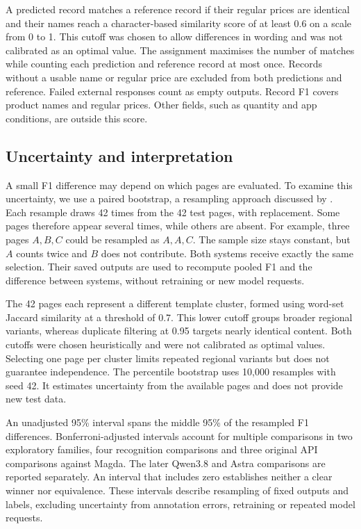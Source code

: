 A predicted record matches a reference record if their regular prices are identical and their names reach a character-based similarity score of at least 0.6 on a scale from 0 to 1. This cutoff was chosen to allow differences in wording and was not calibrated as an optimal value. The assignment maximises the number of matches while counting each prediction and reference record at most once. Records without a usable name or regular price are excluded from both predictions and reference. Failed external responses count as empty outputs. Record F1 covers product names and regular prices. Other fields, such as quantity and app conditions, are outside this score.

\subsection{Uncertainty and interpretation}
A small F1 difference may depend on which pages are evaluated. To examine this uncertainty, we use a paired bootstrap, a resampling approach discussed by \citet{dror2018}. Each resample draws 42 times from the 42 test pages, with replacement. Some pages therefore appear several times, while others are absent. For example, three pages $A,B,C$ could be resampled as $A,A,C$. The sample size stays constant, but $A$ counts twice and $B$ does not contribute. Both systems receive exactly the same selection. Their saved outputs are used to recompute pooled F1 and the difference between systems, without retraining or new model requests.

The 42 pages each represent a different template cluster, formed using word-set Jaccard similarity at a threshold of 0.7. This lower cutoff groups broader regional variants, whereas duplicate filtering at 0.95 targets nearly identical content. Both cutoffs were chosen heuristically and were not calibrated as optimal values. Selecting one page per cluster limits repeated regional variants but does not guarantee independence. The percentile bootstrap uses 10,000 resamples with seed 42. It estimates uncertainty from the available pages and does not provide new test data.

An unadjusted 95\% interval spans the middle 95\% of the resampled F1 differences. Bonferroni-adjusted intervals account for multiple comparisons in two exploratory families, four recognition comparisons and three original API comparisons against Magda. The later Qwen3.8 and Astra comparisons are reported separately. An interval that includes zero establishes neither a clear winner nor equivalence. These intervals describe resampling of fixed outputs and labels, excluding uncertainty from annotation errors, retraining or repeated model requests.

